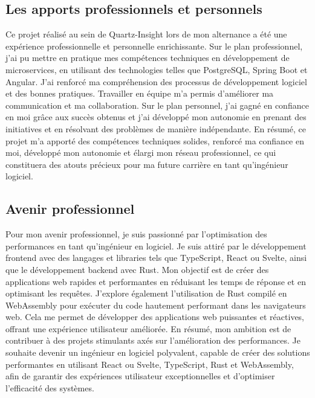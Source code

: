 \documentclass[a4paper, 11pt]{report}
\begin{document}
\subsection{Les apports professionnels et personnels}
Ce projet réalisé au sein de Quartz-Insight lors de mon alternance a été une expérience professionnelle et personnelle enrichissante.
Sur le plan professionnel, j'ai pu mettre en pratique mes compétences techniques en développement de microservices, en utilisant des technologies telles que PostgreSQL, Spring Boot et Angular.
J'ai renforcé ma compréhension des processus de développement logiciel et des bonnes pratiques. 
Travailler en équipe m'a permis d'améliorer ma communication et ma collaboration.
Sur le plan personnel, j'ai gagné en confiance en moi grâce aux succès obtenus et j'ai développé mon autonomie en prenant des initiatives et en résolvant des problèmes de manière indépendante.
En résumé, ce projet m'a apporté des compétences techniques solides, renforcé ma confiance en moi, développé mon autonomie et élargi mon réseau professionnel, ce qui constituera des atouts précieux pour ma future carrière en tant qu'ingénieur logiciel.

\subsection{Avenir professionnel}
Pour mon avenir professionnel, je suis passionné par l'optimisation des performances en tant qu'ingénieur en logiciel. Je suis attiré par le développ\-ement frontend avec des langages et libraries tels que TypeScript, React ou Svelte, ainsi que le développement backend avec Rust. Mon objectif est de créer des applications web rapides et performantes en réduisant les temps de réponse et en optimisant les requêtes.
J'explore également l'utilisation de Rust compilé en WebAssembly pour exécuter du code hautement performant dans les navigateurs web. Cela me permet de développer des applications web puissantes et réactives, offrant une expérience utilisateur améliorée.
En résumé, mon ambition est de contribuer à des projets stimulants axés sur l'amélioration des performances. Je souhaite devenir un ingénieur en logiciel polyvalent, capable de créer des solutions performantes en utilisant React ou Svelte, TypeScript, Rust et WebAssembly, afin de garantir des expériences utilisateur exceptionnelles et d'optimiser l'efficacité des systèmes.
\end{document}
